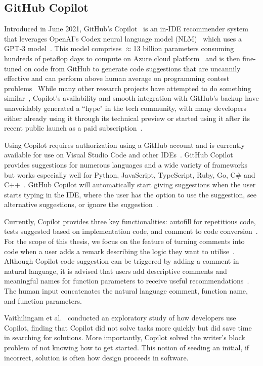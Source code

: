 \subsection{GitHub Copilot}
Introduced in June 2021, GitHub's Copilot~\cite{Copilot-web} is an in-IDE recommender system that leverages OpenAI's Codex neural language model (NLM)~\cite{copilot} which uses a GPT-3 model~\cite{Gpt3}. This model comprises $\approx$13 billion parameters consuming hundreds of petaflop days to compute on Azure cloud platform~\cite{copilot} and is then fine-tuned on code from GitHub to generate code suggestions that are uncannily effective and can perform above human average on programming contest problems~\cite{empirical_eval}
While many other research projects have attempted to do something similar~\cite{codesearch, natural, coacor}, Copilot's availability and smooth integration with GitHub's backup have unavoidably generated a ``hype" in the tech community, with many developers either already using it through its technical preview or started using it after its recent public launch as a paid subscription~\cite{Copilot-web}. 

Using Copilot requires authorization using a GitHub account and is currently available for use on Visual Studio Code and other IDEs~\cite{Copilot-web}. GitHub Copilot provides suggestions for numerous languages and a wide variety of frameworks but works especially well for Python, JavaScript, TypeScript, Ruby, Go, C\# and C++~\cite{Copilot-web}. GitHub Copilot will automatically start giving suggestions when the user starts typing in the IDE, where the user has the option to use the suggestion, see alternative suggestions, or ignore the suggestion~\cite{Copilot-web}.

Currently, Copilot provides three key functionalities: autofill for repetitious code, tests suggested based on implementation code, and comment to code conversion~\cite{Copilot-web}. For the scope of this thesis, we focus on the feature of turning comments into code when a user adds a remark describing the logic they want to utilise~\cite{Copilot-web}. 
Although Copilot code suggestion can be triggered by adding a comment in natural language, it is advised that users add descriptive comments and meaningful names for function parameters to receive useful recommendations~\cite{Copilot-web}. The human input concatenates the natural language comment, function name, and function parameters.

Vaithilingam et al.~\cite{Vaithilingam2022} conducted an exploratory study of how developers use Copilot, finding that Copilot did not solve tasks more quickly but did save time in searching for solutions. 
More importantly, Copilot solved the writer's block problem of not knowing how to get started. This notion of seeding an initial, if incorrect, solution is often how design proceeds in software. 

